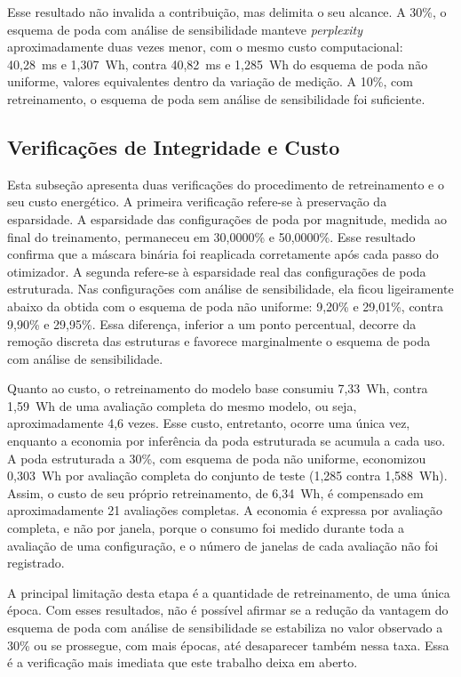 Esse resultado não invalida a contribuição, mas delimita o seu alcance. A 30\%, o esquema de
poda com análise de sensibilidade manteve \textit{perplexity} aproximadamente duas vezes menor,
com o mesmo custo computacional: 40,28~ms e 1,307~Wh, contra 40,82~ms e 1,285~Wh do esquema de
poda não uniforme, valores equivalentes dentro da variação de medição. A 10\%, com
retreinamento, o esquema de poda sem análise de sensibilidade foi suficiente.

\subsection{Verificações de Integridade e Custo}\label{subsec:ft_verificacoes}

Esta subseção apresenta duas verificações do procedimento de retreinamento e o seu custo
energético. A primeira verificação refere-se à preservação da esparsidade.
A esparsidade das configurações de poda por magnitude, medida
ao final do treinamento, permaneceu em 30,0000\% e 50,0000\%. Esse resultado confirma que a
máscara binária foi reaplicada corretamente após cada passo do otimizador. A segunda refere-se
à esparsidade real das configurações de poda estruturada. Nas configurações com análise de
sensibilidade, ela ficou ligeiramente abaixo da obtida com o esquema de poda não uniforme:
9,20\% e 29,01\%, contra 9,90\% e 29,95\%. Essa diferença, inferior a um ponto percentual,
decorre da remoção discreta das estruturas e favorece marginalmente o esquema de poda com
análise de sensibilidade.

Quanto ao custo, o retreinamento do modelo base consumiu 7,33~Wh, contra 1,59~Wh de uma
avaliação completa do mesmo modelo, ou seja, aproximadamente 4,6 vezes. Esse custo, entretanto,
ocorre uma única vez, enquanto a economia por inferência da poda estruturada se acumula a cada
uso. A poda estruturada a 30\%, com esquema de poda não uniforme, economizou 0,303~Wh por
avaliação completa do conjunto de teste (1,285 contra 1,588~Wh). Assim, o custo de seu próprio
retreinamento, de 6,34~Wh, é compensado em aproximadamente 21 avaliações completas. A economia
é expressa por avaliação completa, e não por janela, porque o consumo foi medido durante toda a
avaliação de uma configuração, e o número de janelas de
cada avaliação não foi registrado.

A principal limitação desta etapa é a quantidade de retreinamento, de uma única época. Com
esses resultados, não é possível afirmar se a redução da vantagem do esquema de poda com
análise de sensibilidade se estabiliza no valor observado a 30\% ou se prossegue, com mais
épocas, até desaparecer também nessa taxa. Essa é a verificação mais imediata que este trabalho
deixa em aberto.

